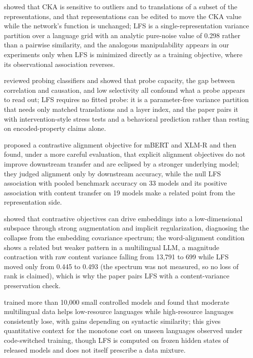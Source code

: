 \documentclass{article} %
\begin{document}
\citet{davari2023cka} showed that CKA is sensitive to outliers and to translations of a subset of the representations, and that representations can be edited to move the CKA value while the network's function is unchanged; LFS is a single-representation variance partition over a language grid with an analytic pure-noise value of 0.298 rather than a pairwise similarity, and the analogous manipulability appears in our experiments only when LFS is minimized directly as a training objective, where its observational association reverses.

\citet{belinkov2022probing} reviewed probing classifiers and showed that probe capacity, the gap between correlation and causation, and low selectivity all confound what a probe appears to read out; LFS requires no fitted probe: it is a parameter-free variance partition that needs only matched translations and a layer index, and the paper pairs it with intervention-style stress tests and a behavioral prediction rather than resting on encoded-property claims alone.

\citet{wu2020explicit} proposed a contrastive alignment objective for mBERT and XLM-R and then found, under a more careful evaluation, that explicit alignment objectives do not improve downstream transfer and are eclipsed by a stronger underlying model; they judged alignment only by downstream accuracy, while the null LFS association with pooled benchmark accuracy on 33 models and its positive association with content transfer on 19 models make a related point from the representation side.

\citet{jing2022collapse} showed that contrastive objectives can drive embeddings into a low-dimensional subspace through strong augmentation and implicit regularization, diagnosing the collapse from the embedding covariance spectrum; the word-alignment condition shows a related but weaker pattern in a multilingual LLM, a magnitude contraction with raw content variance falling from 13,791 to 699 while LFS moved only from 0.445 to 0.493 (the spectrum was not measured, so no loss of rank is claimed), which is why the paper pairs LFS with a content-variance preservation check.

\citet{chang2024curse} trained more than 10,000 small controlled models and found that moderate multilingual data helps low-resource languages while high-resource languages consistently lose, with gains depending on syntactic similarity; this gives quantitative context for the monotone cost on unseen languages observed under code-switched training, though LFS is computed on frozen hidden states of released models and does not itself prescribe a data mixture.
\end{document}
